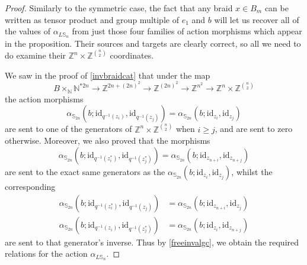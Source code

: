 \documentclass{amsbook} %
\newcommand{\id}{\textrm{id}}
\numberwithin{section}{chapter}
\begin{document}
\begin{proof}
Similarly to the symmetric case, the fact that any braid $x \in B_m$ can be written as tensor product and group multiple of $e_1$ and $b$ will let us recover all of the values of $\alpha_{L\mathbb{S}_n}$ from just those four families of action morphisms which appear in the proposition. Their sources and targets are clearly correct, so all we need to do examine their $\mathbb{Z}^{n} \times \mathbb{Z}^{\binom{n}{2}}$ coordinates.

We saw in the proof of \cref{invbraidcat} that under the map
  \[
    B \times_{\mathbb{N}} \mathbb{N}^{\ast 2n} \rightarrow \mathbb{Z}^{2n + (2n)^2} \rightarrow \mathbb{Z}^{(2n)^2} \rightarrow \mathbb{Z}^{n^2} \rightarrow \mathbb{Z}^n \times \mathbb{Z}^{\binom{n}{2}}
  \]
the action morphisms
  \[
    \alpha_{\mathbb{S}_{2n}}(b; \id_{q^{-1}(z_i)}, \id_{q^{-1}(z_j)}  ) = \alpha_{\mathbb{S}_{2n}}(b; \id_{z_i}, \id_{z_j} )
  \]
are sent to one of the generators of $\mathbb{Z}^{n} \times \mathbb{Z}^{\binom{n}{2}}$ when $i \ge j$, and are sent to zero otherwise. Moreover, we also proved that the morphisms
  \[
    \alpha_{\mathbb{S}_{2n}}\left( b ; \id_{q^{-1}(z_i^*)}, \id_{q^{-1}(z_j^*)} \right) = \alpha_{\mathbb{S}_{2n}}\left( b ;\id_{z_{n+i}}, \id_{z_{n+j}} \right)
  \]
are sent to the exact same generators as the $\alpha_{\mathbb{S}_{2n}}(b;\id_{z_i}, \id_{z_j})$, whilst the corresponding
  \begin{align*}
  	\alpha_{\mathbb{S}_{2n}}\left(  b ;  \id_{q^{-1}(z_i^*)}, \id_{q^{-1}(z_j)}  \right) &= \alpha_{\mathbb{S}_{2n}}\left(  b  ;  \id_{z_{n+i}}, \id_{z_j}  \right) \\
  	\alpha_{\mathbb{S}_{2n}}\left(  b  ;  \id_{q^{-1}(z_i)}, \id_{q^{-1}(z_j^*)}  \right) &= \alpha_{\mathbb{S}_{2n}}\left(  b  ;  \id_{z_i}, \id_{z_{n+j}}  \right) 
  \end{align*}
are sent to that generator's inverse. Thus by \cref{freeinvalgc}, we obtain the required relations for the action $\alpha_{L\mathbb{S}_n}$.
\end{proof}
\end{document}
